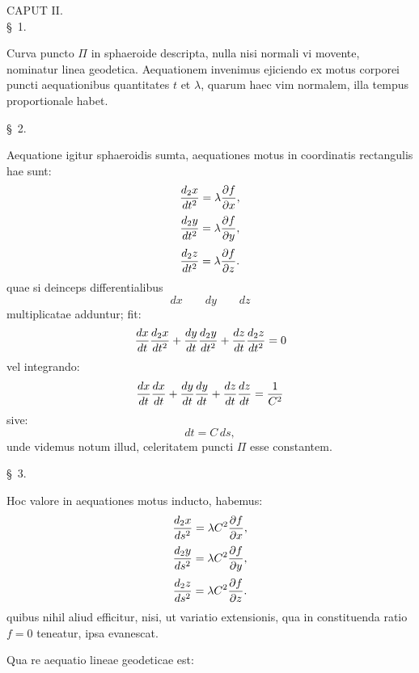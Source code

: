 \begin{center}
{\large CAPUT II.}\\[0.8em]
\S\ 1.
\end{center}
Curva puncto $\Pi$ in sphaeroide descripta, nulla nisi normali vi movente, nominatur linea geodetica. Aequationem invenimus ejiciendo ex motus corporei puncti aequationibus quantitates $t$ et $\lambda$, quarum haec vim normalem, illa tempus proportionale habet.

\begin{center}\S\ 2.\end{center}
Aequatione igitur sphaeroidis  sumta, aequationes motus in coordinatis rectangulis hae sunt:
\[
\begin{gathered}
 {d_2x\over dt^2}=\lambda{\partial f\over\partial x},\\[0.25em]
 {d_2y\over dt^2}=\lambda{\partial f\over\partial y},\\[0.25em]
 {d_2z\over dt^2}=\lambda{\partial f\over\partial z}.
\end{gathered}
\]
quae si deinceps differentialibus
\[
 dx\qquad dy\qquad dz
\]
multiplicatae adduntur; fit:
\[
 {dx\over dt}{d_2x\over dt^2}+{dy\over dt}{d_2y\over dt^2}+{dz\over dt}{d_2z\over dt^2}=0
\]
vel integrando:
\[
 {dx\over dt}{dx\over dt}+{dy\over dt}{dy\over dt}+{dz\over dt}{dz\over dt}={1\over C^2}
\]
sive:
\[
 dt=C\,ds,
\]
unde videmus notum illud, celeritatem puncti $\Pi$ esse constantem.

\begin{center}\S\ 3.\end{center}
Hoc valore in aequationes motus inducto, habemus:
\[
\begin{gathered}
 {d_2x\over ds^2}=\lambda C^2{\partial f\over\partial x},\\[0.25em]
 {d_2y\over ds^2}=\lambda C^2{\partial f\over\partial y},\\[0.25em]
 {d_2z\over ds^2}=\lambda C^2{\partial f\over\partial z}.
\end{gathered}
\]
quibus nihil aliud efficitur, nisi, ut variatio extensionis, qua in constituenda ratio $f=0$ teneatur, ipsa evanescat.

Qua re aequatio lineae geodeticae est:
